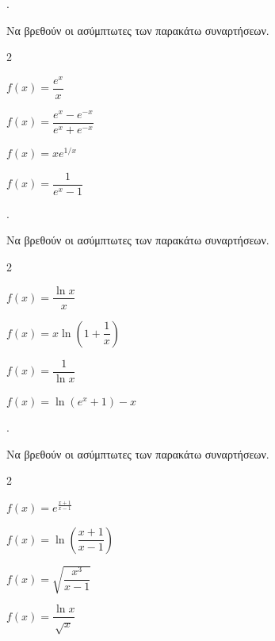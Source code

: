 \documentclass[11pt,a4paper,twocolumn]{article}
\newcounter{askhsh}
\newcommand{\askhsh}{\large\theaskhsh.\ \addtocounter{askhsh}{1}}
\begin{document}
\askhsh Να βρεθούν οι ασύμπτωτες των παρακάτω συναρτήσεων.
\begin{multicols}{2}
\begin{alist}
\item $f(x)=\dfrac{e^x}{x}$
\item $f(x)=\dfrac{e^x-e^{-x}}{e^x+e^{-x}}$
\item $f(x)=xe^{1/x}$
\item $f(x)=\dfrac{1}{e^x-1}$
\end{alist}
\end{multicols}
\askhsh Να βρεθούν οι ασύμπτωτες των παρακάτω συναρτήσεων.
\begin{multicols}{2}
\begin{alist}
\item $f(x)=\dfrac{\ln x}{x}$
\item $f(x)=x\ln{\left(1+\dfrac{1}{x}\right)}$
\item $f(x)=\dfrac{1}{\ln x}$
\item $f(x)=\ln(e^x+1)-x$
\end{alist}
\end{multicols}
\askhsh Να βρεθούν οι ασύμπτωτες των παρακάτω συναρτήσεων.
\begin{multicols}{2}
\begin{alist}
\item $f(x)=e^{\frac{x+1}{x-1}}$
\item $f(x)=\ln{\left(\dfrac{x+1}{x-1}\right)}$
\item $f(x)=\sqrt{\dfrac{x^3}{x-1}}$
\item $f(x)=\dfrac{\ln x}{\sqrt{x}}$
\end{alist}
\end{multicols}
\end{document}
